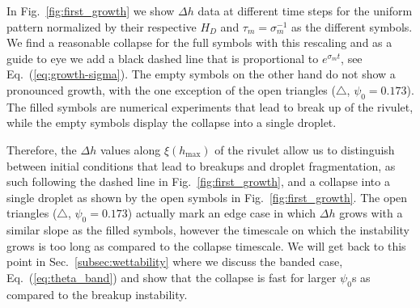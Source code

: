 \documentclass[twoside,twocolumn,9pt]{article}
\begin{document}
In Fig.~\ref{fig:first_growth} we show $\Delta h$ data at different time steps for the uniform pattern normalized by their respective $H_D$ and $\tau_m = \sigma_m^{-1}$ as the different symbols.  
We find a reasonable collapse for the full symbols with this rescaling and as a guide to eye we add a black dashed line that is proportional to $e^{\sigma_m t}$, see Eq.~(\ref{eq:growth-sigma}). 
The empty symbols on the other hand do not show a pronounced growth, with the one exception of the open triangles ($\triangle$, $\psi_0 = 0.173$). 
The filled symbols are numerical experiments that lead to break up of the rivulet, while the empty symbols display the collapse into a single droplet.

Therefore, the $\Delta h$ values along $\xi(h_{\max})$ of the rivulet allow us to distinguish between initial conditions that lead to breakups and droplet fragmentation, as such following the dashed line in Fig.~\ref{fig:first_growth}, and a collapse into a single droplet as shown by the open symbols in Fig.~\ref{fig:first_growth}.
The open triangles ($\triangle$, $\psi_0 = 0.173$) actually mark an edge case in which $\Delta h$ grows with a similar slope as the filled symbols, however the timescale on which the instability grows is too long as compared to the collapse timescale. 
We will get back to this point in Sec.~\ref{subsec:wettability} where we discuss the banded case, Eq.~(\ref{eq:theta_band}) and show that the collapse is fast for larger $\psi_0$s as compared to the breakup instability.
\end{document}
